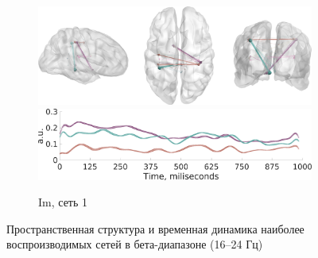 \begin{figure}
\begin{subfigure}[b]{0.4\textwidth}
 \includegraphics[width=\textwidth]{../images/psiicos_paper/Figure12_c1.jpg}
 \includegraphics[width=\textwidth]{../images/psiicos_paper/Figure12_c2.jpg}

 \caption{Im, сеть 1}\label{fig:12c}
 \end{subfigure}
 \caption{Пространственная структура и временная динамика наиболее воспроизводимых сетей в бета-диапазоне (16--24 Гц)}\label{fig:12}
\end{figure} %

